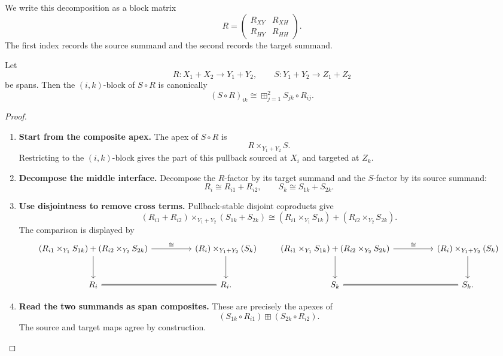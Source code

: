 We write this decomposition as a block matrix
\[
  R=
  \begin{pmatrix}
    R_{XY} & R_{XH}\\
    R_{HY} & R_{HH}
  \end{pmatrix}.
\]
The first index records the source summand and the second records the target
summand.

\begin{lemma}
\label{lem:span-matrix-multiplication}
Let
\[
  R:X_1+X_2\to Y_1+Y_2,
  \qquad
  S:Y_1+Y_2\to Z_1+Z_2
\]
be spans. Then the \((i,k)\)-block of \(S\circ R\) is canonically
\[
  (S\circ R)_{ik}
  \cong
  \boxplus_{j=1}^{2}
  S_{jk}\circ R_{ij}.
\]
\end{lemma}

\begin{proof}
\begin{enumerate}
  \item \textbf{Start from the composite apex.}
  The apex of \(S\circ R\) is
  \[
    R\times_{Y_1+Y_2}S.
  \]
  Restricting to the \((i,k)\)-block gives the part of this pullback sourced
  at \(X_i\) and targeted at \(Z_k\).

  \item \textbf{Decompose the middle interface.}
  Decompose the \(R\)-factor by its target summand and the \(S\)-factor by its
  source summand:
  \[
    R_i\cong R_{i1}+R_{i2},
    \qquad
    S_k\cong S_{1k}+S_{2k}.
  \]

  \item \textbf{Use disjointness to remove cross terms.}
  Pullback-stable disjoint coproducts give
  \[
    (R_{i1}+R_{i2})\times_{Y_1+Y_2}(S_{1k}+S_{2k})
    \cong
    (R_{i1}\times_{Y_1}S_{1k})
    +
    (R_{i2}\times_{Y_2}S_{2k}).
  \]
  The comparison is displayed by
  \[
  \begin{tikzcd}[column sep=huge,row sep=large]
    (R_{i1}\times_{Y_1}S_{1k})+(R_{i2}\times_{Y_2}S_{2k})
      \ar[r,"\cong"]
      \ar[d]
    &
    (R_i)\times_{Y_1+Y_2}(S_k)
      \ar[d]
    \\
    R_i
      \ar[r,equal]
    &
    R_i .
  \end{tikzcd}
  \qquad
  \begin{tikzcd}[column sep=huge,row sep=large]
    (R_{i1}\times_{Y_1}S_{1k})+(R_{i2}\times_{Y_2}S_{2k})
      \ar[r,"\cong"]
      \ar[d]
    &
    (R_i)\times_{Y_1+Y_2}(S_k)
      \ar[d]
    \\
    S_k
      \ar[r,equal]
    &
    S_k .
  \end{tikzcd}
  \]

  \item \textbf{Read the two summands as span composites.}
  These are precisely the apexes of
  \[
    (S_{1k}\circ R_{i1})
    \boxplus
    (S_{2k}\circ R_{i2}).
  \]
  The source and target maps agree by construction.
\end{enumerate}
\end{proof}

